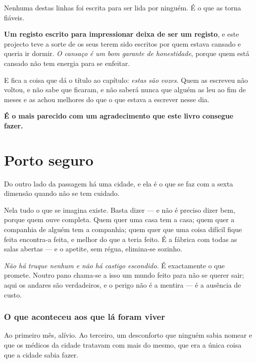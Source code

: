 \documentclass[livro.tex]{subfiles}
\begin{document}
Nenhuma destas linhas foi escrita para ser lida por ninguém. É o que as torna fiáveis.

\medskip

\textbf{Um registo escrito para impressionar deixa de ser um registo}, e este projecto teve a sorte
de os seus terem sido escritos por quem estava cansado e queria ir dormir. \emph{O cansaço é um
bom garante de honestidade}, porque quem está cansado não tem energia para se enfeitar.

\medskip

E fica a coisa que dá o título ao capítulo: \emph{estas são vozes}. Quem as escreveu não voltou, e
não sabe que ficaram, e não saberá nunca que alguém as leu ao fim de meses e as achou melhores do
que o que estava a escrever nesse dia.

\medskip

\textbf{É o mais parecido com um agradecimento que este livro consegue fazer.}

\chapter{Porto seguro}

Do outro lado da passagem há uma cidade, e ela é o que se faz com a sexta dimensão quando não se
tem cuidado.

\medskip

Nela tudo o que se imagina existe. Basta dizer --- e não é preciso dizer bem, porque quem ouve
completa. Quem quer uma casa tem a casa; quem quer a companhia de alguém tem a companhia;
quem quer que uma coisa difícil fique feita encontra-a feita, e melhor do que a teria feito.
É a fábrica com todas as salas abertas --- e o apetite, sem régua, elimina-se sozinho.

\medskip

\emph{Não há truque nenhum e não há castigo escondido.} É exactamente o que promete. Noutro
pano chama-se a isso um mundo feito para não se querer sair; aqui os andares são verdadeiros,
e o perigo não é a mentira --- é a ausência de custo.

\subsection*{O que aconteceu aos que lá foram viver}

Ao primeiro mês, alívio. Ao terceiro, um desconforto que ninguém sabia nomear e que os médicos da
cidade tratavam com mais do mesmo, que era a única coisa que a cidade sabia fazer.
\end{document}
